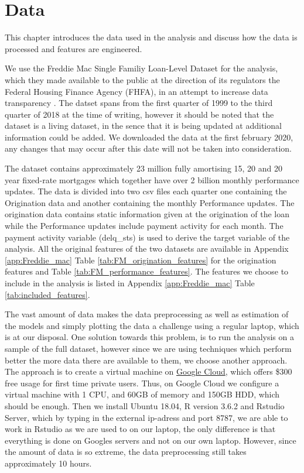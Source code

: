 \chapter{Data}
This chapter introduces the data used in the analysis and discuss how the data is processed and features are engineered. 

We use the Freddie Mac Single Familiy Loan-Level Dataset for the analysis, which they made available to the public at the direction of its regulators the Federal Housing Finance Agency (FHFA), in an attempt to increase data transparency \cite[p. 3]{Freddie_mac_guide}. The datset spans from the first quarter of 1999 to the third quarter of 2018 at the time of writing, however it should be noted that the dataset is a living dataset, in the sence that it is being updated at additional information could be added. We downloaded the data at the first february 2020, any changes that may occur after this date will not be taken into consideration. 

The dataset contains approximately 23 million  fully amortising 15, 20 and 20 year fixed-rate mortgages which together have over 2 billion monthly performance updates. The data is divided into two csv files each quarter one containing the Origination data and another containing the monthly Performance updates. The origination data contains static information given at the origination of the loan while the Performance updates include payment activity for each month. The payment activity variable (delq\_sts) is used to derive the target variable of the analysis. All the original features of the two datasets are available in Appendix \ref{app:Freddie_mac} Table \vref{tab:FM_origination_features} for the origination features and Table \vref{tab:FM_performance_features}. The features we choose to include in the analysis is listed in Appendix \ref{app:Freddie_mac} Table \vref{tab:included_features}.

The vast amount of data makes the data preprocessing as well as estimation of the models and simply plotting the data a challenge using a regular laptop, which is at our disposal. One solution towards this problem, is to run the analysis on a sample of the full dataset, however since we are using techniques which perform better the more data there are available to them, we choose another approach. The approach is to create a virtual machine on \href{https://cloud.google.com/}{Google Cloud}, which offers \$300 free usage for first time private users. Thus, on Google Cloud we configure a virtual machine with 1 CPU, and 60GB of memory and 150GB HDD, which should be enough. Then we install Ubuntu 18.04, R version 3.6.2 and Rstudio Server, which by typing in the external ip-adress and port 8787, we are able to work in Rstudio as we are used to on our laptop, the only difference is that everything is done on Googles servers and not on our own laptop. However, since the amount of data is so extreme, the data preprocessing still takes approximately 10 hours.


